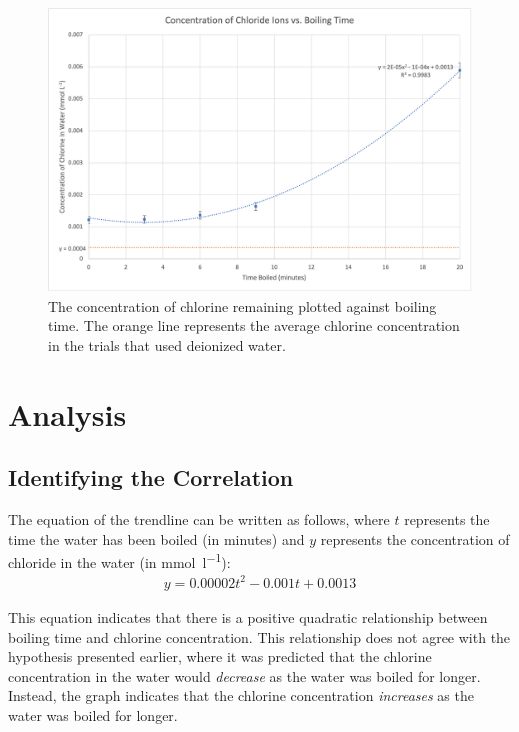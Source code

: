 \documentclass[11pt]{article}
\begin{document}
\begin{figure}[H]
	\centering
	\caption{The concentration of chlorine remaining plotted against boiling time. The orange line represents the average chlorine concentration in the trials that used deionized water.}
	\includegraphics[width=\linewidth]{assets/concentration-vs-boiling-time.png}
\end{figure}

\section{Analysis}

\subsection{Identifying the Correlation}

The equation of the trendline can be written as follows, where $t$ represents the time the water has been boiled (in minutes) and $y$ represents the concentration of chloride in the water (in \si{\mmol\per\litre}):
%
\begin{align*}
	y = 0.00002t^2 - 0.001t + 0.0013
\end{align*}

This equation indicates that there is a positive quadratic relationship between boiling time and chlorine concentration. This relationship does not agree with the hypothesis presented earlier, where it was predicted that the chlorine concentration in the water would \textit{decrease} as the water was boiled for longer. Instead, the graph indicates that the chlorine concentration \textit{increases} as the water was boiled for longer.
\end{document}
